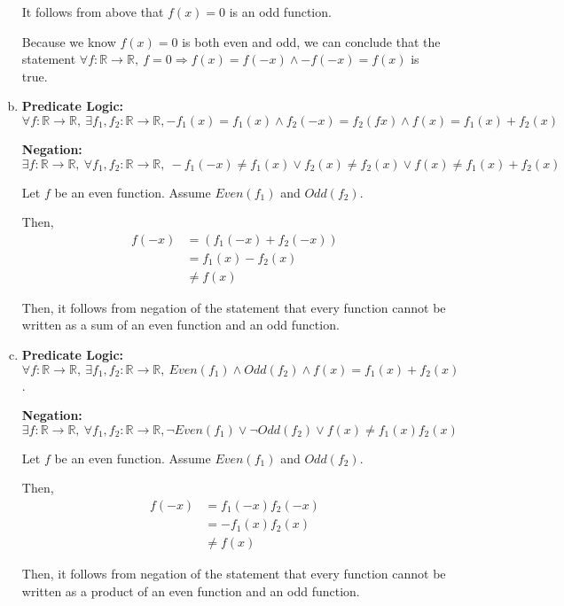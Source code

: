 \documentclass[12pt]{article}
\begin{document}
\begin{enumerate}[a.]
    It follows from above that $f(x) = 0$ is an odd function.

    \bigbreak

    Because we know $f(x) = 0$ is both even and odd, we can conclude that the statement
    $\forall f: \mathbb{R} \to \mathbb{R},\:f = 0 \Rightarrow f(x) = f(-x) \land -f(-x)
    = f(x)$ is true.

    \item

    \textbf{Predicate Logic:} $\forall f:\mathbb{R} \to \mathbb{R},\:\exists f_1,
    f_2: \mathbb{R} \to \mathbb{R}, -f_1(x) = f_1(x) \land f_2(-x) = f_2(fx)
    \land f(x) = f_1(x) + f_2(x)$

    \bigskip

    \textbf{Negation:} $\exists f: \mathbb{R} \to \mathbb{R},\:\forall f_1,f_2:
    \mathbb{R} \to \mathbb{R},\:-f_1(-x) \neq f_1(x) \lor f_2(x) \neq f_2(x) \lor
    f(x) \neq f_1(x) + f_2(x)$

    \bigskip

    Let $f$ be an even function. Assume $Even(f_1)$ and $Odd(f_2)$.

    \bigskip

    Then,
    \setcounter{equation}{0}
    \begin{align}
        f(-x) &= (f_1(-x) + f_2(-x))\\
        &= f_1(x) - f_2(x)\\
        &\neq f(x)
    \end{align}

    \bigskip

    Then, it follows from negation of the statement that every function cannot be
    written as a sum of an even function and an odd function.

    \item

    \textbf{Predicate Logic:} $\forall f: \mathbb{R} \to \mathbb{R},\:\exists f_1,
    f_2: \mathbb{R} \to \mathbb{R},\:Even(f_1) \land Odd(f_2) \land f(x) = f_1(x)
    + f_2(x)$.

    \bigskip

    \textbf{Negation:} $\exists f: \mathbb{R} \to \mathbb{R},\:\forall f_1,f_2:
    \mathbb{R} \to \mathbb{R}, \neg Even(f_1) \lor \neg Odd(f_2) \lor f(x) \neq f_1(x)f_2(x)$

    \bigskip

    Let $f$ be an even function. Assume $Even(f_1)$ and $Odd(f_2)$.

    \bigskip

    Then,
    \setcounter{equation}{0}
    \begin{align}
        f(-x) &= f_1(-x)f_2(-x)\\
        &= -f_1(x)f_2(x)\\
        &\neq f(x)
    \end{align}

    Then, it follows from negation of the statement that every function cannot be
    written as a product of an even function and an odd function.


\end{enumerate}
\end{document}
